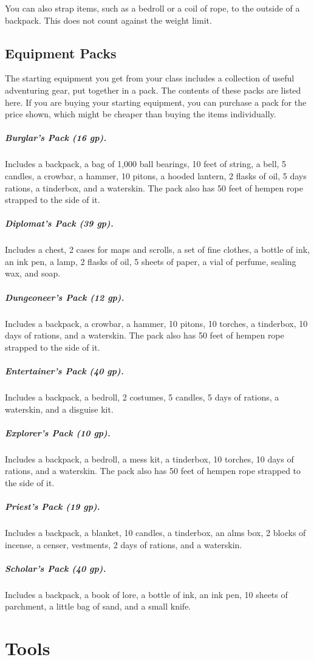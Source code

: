 You can also strap items, such as a bedroll or a coil of rope, to the outside of a backpack. This does not count against the weight limit.

\subsection{Equipment Packs}

The starting equipment you get from your class includes a collection of useful adventuring gear, put together in a pack. The contents of these packs are listed here. If you are buying your starting equipment, you can purchase a pack for the price shown, which might be cheaper than buying the items individually.

\subparagraph*{Burglar's Pack (16 gp).} Includes a backpack, a bag of 1,000 ball bearings, 10 feet of string, a bell, 5 candles, a crowbar, a hammer, 10 pitons, a hooded lantern, 2 flasks of oil, 5 days rations, a tinderbox, and a waterskin. The pack also has 50 feet of hempen rope strapped to the side of it.

\subparagraph*{Diplomat's Pack (39 gp).} Includes a chest, 2 cases for maps and scrolls, a set of fine clothes, a bottle of ink, an ink pen, a lamp, 2 flasks of oil, 5 sheets of paper, a vial of perfume, sealing wax, and soap.

\subparagraph*{Dungeoneer's Pack (12 gp).} Includes a backpack, a crowbar, a hammer, 10 pitons, 10 torches, a tinderbox, 10 days of rations, and a waterskin. The pack also has 50 feet of hempen rope strapped to the side of it.

\subparagraph*{Entertainer's Pack (40 gp).} Includes a backpack, a bedroll, 2 costumes, 5 candles, 5 days of rations, a waterskin, and a disguise kit.

\subparagraph*{Explorer's Pack (10 gp).} Includes a backpack, a bedroll, a mess kit, a tinderbox, 10 torches, 10 days of rations, and a waterskin. The pack also has 50 feet of hempen rope strapped to the side of it.

\subparagraph*{Priest's Pack (19 gp).} Includes a backpack, a blanket, 10 candles, a tinderbox, an alms box, 2 blocks of incense, a censer, vestments, 2 days of rations, and a waterskin.

\subparagraph*{Scholar's Pack (40 gp).} Includes a backpack, a book of lore, a bottle of ink, an ink pen, 10 sheets of parchment, a little bag of sand, and a small knife.

\section{Tools}

